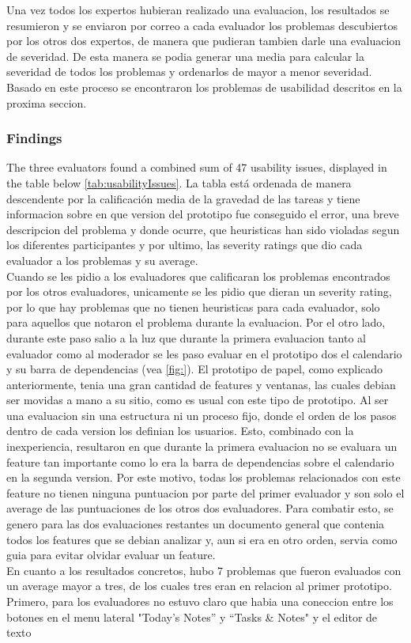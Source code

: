 Una vez todos los expertos hubieran realizado una evaluacion, los resultados se resumieron y se enviaron por correo a cada evaluador los problemas descubiertos por los otros dos expertos, de manera que pudieran tambien darle una evaluacion de severidad. De esta manera se podia generar una media para calcular la severidad de todos los problemas y ordenarlos de mayor a menor severidad. Basado en este proceso se encontraron los problemas de usabilidad descritos en la proxima seccion.

\subsubsection{Findings}
The three evaluators found a combined sum of 47 usability issues, displayed in the table below \ref{tab:usabilityIssues}. La tabla está ordenada de manera descendente por la calificación media de la gravedad de las tareas y tiene informacion sobre en que version del prototipo fue conseguido el error, una breve descripcion del problema y donde ocurre, que heuristicas han sido violadas segun los diferentes participantes y por ultimo, las severity ratings que dio cada evaluador a los problemas y su average. \\
Cuando se les pidio a los evaluadores que calificaran los problemas encontrados por los otros evaluadores, unicamente se les pidio que dieran un severity rating, por lo que hay problemas que no tienen heuristicas para cada evaluador, solo para aquellos que notaron el problema durante la evaluacion. Por el otro lado, durante este paso salio a la luz que durante la primera evaluacion tanto al evaluador como al moderador se les paso evaluar en el prototipo dos el calendario y su barra de dependencias (vea \ref{fig:}). El prototipo de papel, como explicado anteriormente, tenia una gran cantidad de features y ventanas, las cuales debian ser movidas a mano a su sitio, como es usual con este tipo de prototipo. Al ser una evaluacion sin una estructura ni un proceso fijo, donde el orden de los pasos dentro de cada version los definian los usuarios. Esto, combinado con la inexperiencia, resultaron en que durante la primera evaluacion no se evaluara un feature tan importante como lo era la barra de dependencias sobre el calendario en la segunda version. Por este motivo, todas los problemas relacionados con este feature no tienen ninguna puntuacion por parte del primer evaluador y son solo el average de las puntuaciones de los otros dos evaluadores. Para combatir esto, se genero para las dos evaluaciones restantes un documento general que contenia todos los features que se debian analizar y, aun si era en otro orden, servia como guia para evitar olvidar evaluar un feature.\\
En cuanto a los resultados concretos, hubo 7 problemas que fueron evaluados con un average mayor a tres, de los cuales tres eran en relacion al primer prototipo. Primero, para los evaluadores no estuvo claro que habia una coneccion entre los botones en el menu lateral "Today’s Notes” y “Tasks & Notes" y el editor de texto

